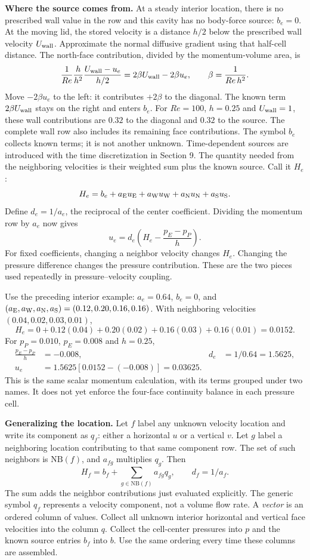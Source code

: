 \textbf{Where the source comes from.} At a steady interior location, there is
no prescribed wall value in the row and this cavity has no body-force source:
$b_e=0$. At the moving lid, the stored velocity is a distance $h/2$ below the
prescribed wall velocity $U_{\rm wall}$. Approximate the normal diffusive
gradient using that half-cell distance. The north-face contribution, divided
by the momentum-volume area, is
\[
\frac{1}{Re}\frac{h}{h^2}\frac{U_{\rm wall}-u_e}{h/2}
=2\beta U_{\rm wall}-2\beta u_e,\qquad \beta=\frac{1}{Re\,h^2}.
\]
Move $-2\beta u_e$ to the left: it contributes $+2\beta$ to the diagonal.
The known term $2\beta U_{\rm wall}$ stays on the right and enters $b_e$.
For $Re=100$, $h=0.25$ and $U_{\rm wall}=1$, these wall contributions are
$0.32$ to the diagonal and $0.32$ to the source. The complete wall row also
includes its remaining face contributions. The symbol $b_e$ collects known
terms; it is not another unknown. Time-dependent sources are introduced
with the time discretization in Section 9.
\newpage
{}
The quantity needed from the neighboring velocities is their weighted sum
plus the known source. Call it $H_e$:
\[
H_e=b_e+a_{\rm E}u_{\rm E}+a_{\rm W}u_{\rm W}
        +a_{\rm N}u_{\rm N}+a_{\rm S}u_{\rm S}.
\]
Define $d_e=1/a_e$, the reciprocal of the center coefficient. Dividing the
momentum row by $a_e$ now gives
\[
\boxed{u_e=d_e\left(H_e-\frac{p_E-p_P}{h}\right).}
\]
For fixed coefficients, changing a neighbor velocity changes $H_e$.
Changing the pressure difference changes the pressure contribution. These are
the two pieces used repeatedly in pressure--velocity coupling.

Use the preceding interior example: $a_e=0.64$, $b_e=0$, and
$(a_{\rm E},a_{\rm W},a_{\rm N},a_{\rm S})=(0.12,0.20,0.16,0.16)$.
With neighboring velocities $(0.04,0.02,0.03,0.01)$,
\[
H_e=0+0.12(0.04)+0.20(0.02)+0.16(0.03)+0.16(0.01)=0.0152.
\]
For $p_P=0.010$, $p_E=0.008$ and $h=0.25$,
\begin{align*}
\frac{p_E-p_P}{h}&=-0.008, & d_e&=1/0.64=1.5625,\\
u_e&=1.5625[0.0152-(-0.008)]=0.03625.
\end{align*}
This is the same scalar momentum calculation, with its terms grouped under
two names. It does not yet enforce the four-face continuity balance in
each pressure cell.

\textbf{Generalizing the location.} Let $f$ label any unknown velocity location
and write its component as $q_f$: either a horizontal $u$ or a vertical $v$.
Let $g$ label a neighboring location contributing to that same component row.
The set of such neighbors is $\mathrm{NB}(f)$, and $a_{fg}$ multiplies $q_g$.
Then
\[
H_f=b_f+\sum_{g\in\mathrm{NB}(f)}a_{fg}q_g,\qquad d_f=1/a_f.
\]
The sum adds the neighbor contributions just evaluated explicitly.
The generic symbol $q_f$ represents a velocity component, not a volume flow rate.
\newpage
{}
A \emph{vector} is an ordered column of values. Collect all unknown interior
horizontal and vertical face velocities into the column $q$. Collect the
cell-center pressures into $p$ and the known source entries $b_f$ into $b$.
Use the same ordering every time these columns are assembled.

